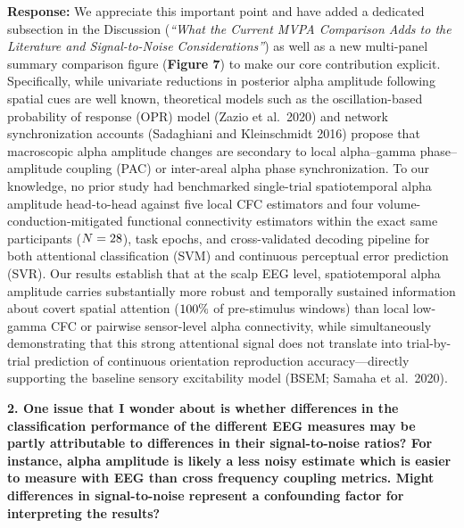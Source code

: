 \documentclass[11pt]{article}
\newcommand{\revcomment}[1]{\vspace{6pt}\noindent\textbf{\textcolor{commentgray}{#1}}\par\vspace{2pt}}
\newcommand{\authorresp}[1]{\noindent\textcolor{revblue}{\textbf{Response:}} #1\par\vspace{6pt}}
\begin{document}
\authorresp{We appreciate this important point and have added a dedicated subsection in the Discussion (\textit{``What the Current MVPA Comparison Adds to the Literature and Signal-to-Noise Considerations''}) as well as a new multi-panel summary comparison figure (\textbf{Figure 7}) to make our core contribution explicit. Specifically, while univariate reductions in posterior alpha amplitude following spatial cues are well known, theoretical models such as the oscillation-based probability of response (OPR) model (Zazio et al.\ 2020) and network synchronization accounts (Sadaghiani and Kleinschmidt 2016) propose that macroscopic alpha amplitude changes are secondary to local alpha--gamma phase--amplitude coupling (PAC) or inter-areal alpha phase synchronization. To our knowledge, no prior study had benchmarked single-trial spatiotemporal alpha amplitude head-to-head against five local CFC estimators and four volume-conduction-mitigated functional connectivity estimators within the exact same participants ($N = 28{}$), task epochs, and cross-validated decoding pipeline for both attentional classification (SVM) and continuous perceptual error prediction (SVR). Our results establish that at the scalp EEG level, spatiotemporal alpha amplitude carries substantially more robust and temporally sustained information about covert spatial attention ($100\%{}$ of pre-stimulus windows) than local low-gamma CFC or pairwise sensor-level alpha connectivity, while simultaneously demonstrating that this strong attentional signal does not translate into trial-by-trial prediction of continuous orientation reproduction accuracy---directly supporting the baseline sensory excitability model (BSEM; Samaha et al.\ 2020).}

\revcomment{2. One issue that I wonder about is whether differences in the classification performance of the different EEG measures may be partly attributable to differences in their signal-to-noise ratios? For instance, alpha amplitude is likely a less noisy estimate which is easier to measure with EEG than cross frequency coupling metrics. Might differences in signal-to-noise represent a confounding factor for interpreting the results?}
\end{document}

